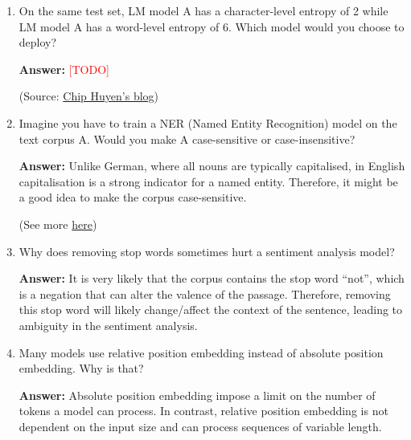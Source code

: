 \documentclass{article}
\newenvironment{QandA}{\begin{enumerate}[label=\arabic*.]}{\end{enumerate}}
\newenvironment{answer}{\par\normalfont \textbf{Answer:}}{}
\newcommand{\todo}{\textcolor{red}{[TODO]}}
\begin{document}
\begin{QandA}
\begin{answer}
        (Source: \href{https://en.wikipedia.org/wiki/BLEU}{Wikipedia}, \href{https://www.youtube.com/watch?v=M05L1DhFqcw}{HuggingFace})
    \end{answer}

    \item On the same test set, LM model A has a character-level entropy of 2 while LM model A has a word-level entropy of 6. Which model would you choose to deploy?
    \begin{answer}
        \todo 
        
        (Source: \href{https://thegradient.pub/understanding-evaluation-metrics-for-language-models/}{Chip Huyen's blog})
    \end{answer}

    \item Imagine you have to train a NER (Named Entity Recognition) model on the text corpus A. Would you make A case-sensitive or case-insensitive?
    \begin{answer}
        Unlike German, where all nouns are typically capitalised, in English capitalisation is a strong indicator for a named entity. Therefore, it might be a good idea to make the corpus case-sensitive. 

        (See more \href{https://stackoverflow.com/questions/56384231/case-sensitive-entity-recognition}{here})
    \end{answer}

    \item Why does removing stop words sometimes hurt a sentiment analysis model?
    \begin{answer}
        It is very likely that the corpus contains the stop word ``not'', which is a negation that can alter the valence of the passage. Therefore, removing this stop word will likely change/affect the context of the sentence, leading to ambiguity in the sentiment analysis.
    \end{answer}

    \item Many models use relative position embedding instead of absolute position embedding. Why is that?
    \begin{answer}
        Absolute position embedding impose a limit on the number of tokens a model can process. In contrast, relative position embedding is not dependent on the input size and can process sequences of variable length. 
    \end{answer}


\end{QandA}
\end{document}
